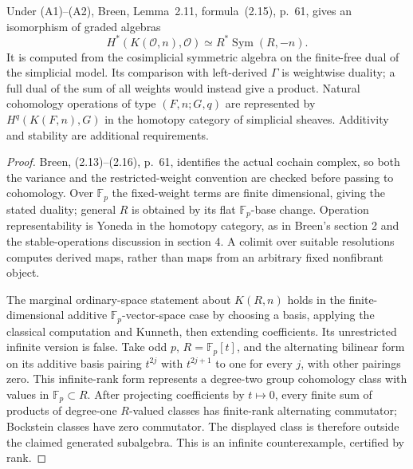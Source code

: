 \begin{proposition}
\label{sa08:D016}
Under (A1)--(A2), Breen, Lemma~2.11, formula~(2.15), p.~61, gives
an isomorphism of graded algebras
\[
 H^*(K(\mathcal O,n),\mathcal O)
 \simeq R^*\operatorname{Sym}(R,-n).
\]
It is computed from the cosimplicial symmetric algebra on the
finite-free dual of the simplicial model. Its comparison with
left-derived $\Gamma$ is weightwise duality; a full dual of the
sum of all weights would instead give a product. Natural
cohomology operations of type $(F,n;G,q)$ are represented by
$H^q(K(F,n),G)$ in the homotopy category of simplicial sheaves.
Additivity and stability are additional requirements.
\end{proposition}
\begin{proof}
Breen, (2.13)--(2.16), p.~61, identifies the actual cochain
complex, so both the variance and the restricted-weight convention
are checked before passing to cohomology. Over $\mathbb F_p$ the
fixed-weight terms are finite dimensional, giving the stated
duality; general $R$ is obtained by its flat
$\mathbb F_p$-base change. Operation representability is Yoneda
in the homotopy category, as in Breen's section 2 and the
stable-operations discussion in section 4. A colimit over suitable
resolutions computes derived maps, rather than maps from an
arbitrary fixed nonfibrant object.

The marginal ordinary-space statement about $K(R,n)$ holds in
the finite-dimensional additive $\mathbb F_p$-vector-space case
by choosing a basis, applying the classical computation and
Kunneth, then extending coefficients. Its unrestricted infinite
version is false. Take odd $p$, $R=\mathbb F_p[t]$, and the
alternating bilinear form on its additive basis pairing
$t^{2j}$ with $t^{2j+1}$ to one for every $j$, with other pairings
zero. This infinite-rank form represents a degree-two group
cohomology class with values in $\mathbb F_p\subset R$.
After projecting coefficients by $t\mapsto0$, every finite sum
of products of degree-one $R$-valued classes has finite-rank
alternating commutator; Bockstein classes have zero commutator.
The displayed class is therefore outside the claimed generated
subalgebra. This is an infinite counterexample, certified by rank.
\end{proof}

